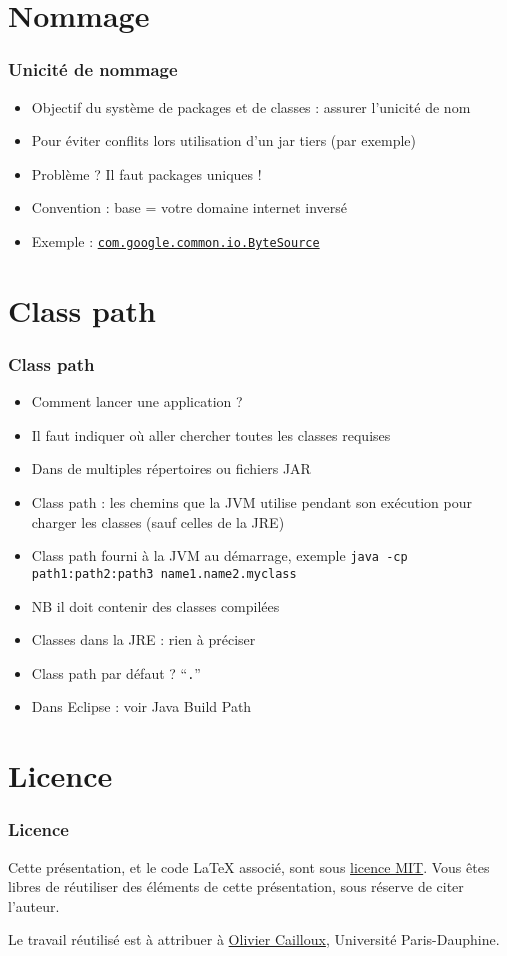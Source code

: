 \documentclass[english, french]{beamer}
\begin{document}
\section{Nommage}
\begin{frame}
	\frametitle{Unicité de nommage}
	\begin{itemize}
		\item Objectif du système de packages et de classes : assurer l’unicité de nom
		\item Pour éviter conflits lors utilisation d’un jar tiers (par exemple)
		\item Problème ? \pause Il faut packages uniques !
		\item Convention : base = votre domaine internet inversé
		\item Exemple : \href{https://github.com/google/guava/blob/master/guava/src/com/google/common/io/ByteSource.java}{\texttt{com.google.common.io.ByteSource}}
	\end{itemize}
\end{frame}

\section{Class path}
\begin{frame}
	\frametitle{Class path}
	\begin{itemize}
		\item Comment lancer une application ?
		\item Il faut indiquer où aller chercher toutes les classes requises
		\item Dans de multiples répertoires ou fichiers JAR
		\item Class path : les chemins que la JVM utilise pendant son exécution pour charger les classes (sauf celles de la JRE)
		\item Class path fourni à la JVM au démarrage, exemple \texttt{java -cp path1:path2:path3 name1.name2.myclass}
		\item NB il doit contenir des classes compilées
		\item Classes dans la JRE : rien à préciser
		\item Class path par défaut ? \pause “\texttt{.}”
		\item Dans Eclipse : voir Java Build Path
	\end{itemize}
\end{frame}

\appendix

\section{Licence}
\begin{frame}
	\frametitle{Licence}
	Cette présentation, et le code LaTeX associé, sont sous \href{http://opensource.org/licenses/MIT}{licence MIT}. Vous êtes libres de réutiliser des éléments de cette présentation, sous réserve de citer l’auteur.
	
	Le travail réutilisé est à attribuer à \href{http://www.lamsade.dauphine.fr/~ocailloux/}{Olivier Cailloux}, Université Paris-Dauphine.
\end{frame}
\end{document}
